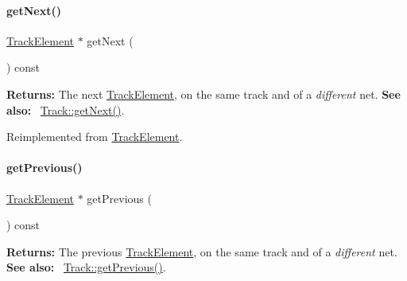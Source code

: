 \mbox{\label{classKite_1_1TrackFixedSegment_a010b7fc8801c5b88aefa4137cf85186d}} 
\paragraph{\texorpdfstring{get\+Next()}{getNext()}}
{\footnotesize\ttfamily \mbox{\hyperlink{classKite_1_1TrackElement}{Track\+Element}} $\ast$ get\+Next (\begin{DoxyParamCaption}{ }\end{DoxyParamCaption}) const\hspace{0.3cm}{\ttfamily [virtual]}}

{\bfseries Returns\+:} The next \mbox{\hyperlink{classKite_1_1TrackElement}{Track\+Element}}, on the same track and of a {\itshape different} net. {\bfseries See also\+:}~ \mbox{\hyperlink{classKite_1_1Track_af3db59591bef3c690ace92c114a4e4aa}{Track\+::get\+Next()}}. 

Reimplemented from \mbox{\hyperlink{classKite_1_1TrackElement_a010b7fc8801c5b88aefa4137cf85186d}{Track\+Element}}.

\mbox{\label{classKite_1_1TrackFixedSegment_a55d6115d84c11ad147f4c38fe372ea24}} 
\paragraph{\texorpdfstring{get\+Previous()}{getPrevious()}}
{\footnotesize\ttfamily \mbox{\hyperlink{classKite_1_1TrackElement}{Track\+Element}} $\ast$ get\+Previous (\begin{DoxyParamCaption}{ }\end{DoxyParamCaption}) const\hspace{0.3cm}{\ttfamily [virtual]}}

{\bfseries Returns\+:} The previous \mbox{\hyperlink{classKite_1_1TrackElement}{Track\+Element}}, on the same track and of a {\itshape different} net. {\bfseries See also\+:}~ \mbox{\hyperlink{classKite_1_1Track_a290fcfe6131730d216951a3b5207d777}{Track\+::get\+Previous()}}. 

